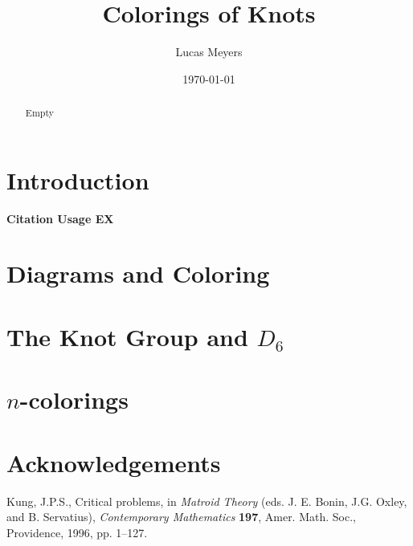 \documentclass[12pt]{amsart}
\theoremstyle{definition}
\theoremstyle{remark}
\numberwithin{equation}{section}
\begin{document}
\title{Colorings of Knots}


\author{Lucas Meyers}
\address{Mathematics Department\\
Louisiana State University\\
Baton Rouge, Louisiana}

\date{\today}

\begin{abstract}
  Empty
\end{abstract}



\maketitle

\section{Introduction}
\label{introduction}

\textbf{Citation Usage EX}~\cite[Problem 2.4.6]{jpsk}

\section{Diagrams and Coloring}
\label{sec:diagrams-coloring}

\section{The Knot Group and $D_6$}
\label{sec:knot-group-d_6}

\section{$n$-colorings}
\label{sec:n-colorings}


\section*{Acknowledgements}
\begin{thebibliography}{99}

 Kung, J.P.S., Critical problems, in {\em Matroid  
Theory} (eds. J. E. Bonin, J.G. Oxley, and B. Servatius), {\em  
Contemporary Mathematics} {\bf 197}, Amer. Math. Soc., Providence,  
1996, pp. 1--127.

\end{thebibliography}
\end{document}
